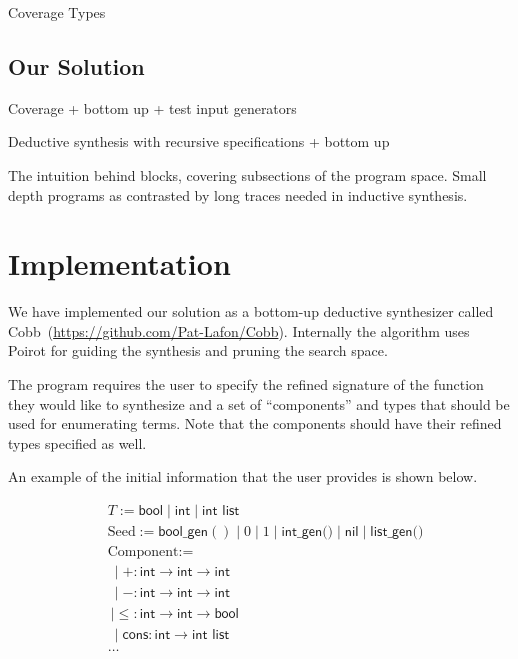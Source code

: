 \documentclass[review, sigplan]{acmart}
\begin{document}
Coverage Types\cite{Poirot}

\subsection{Our Solution}

Coverage + bottom up + test input generators

Deductive synthesis with recursive specifications + bottom up

The intuition behind blocks, covering subsections of the program space. Small
depth programs as contrasted by long traces needed in inductive synthesis.

\section{Implementation}
We have implemented our solution as a bottom-up deductive synthesizer called
Cobb~(\url{https://github.com/Pat-Lafon/Cobb}).
Internally the algorithm uses Poirot for guiding the synthesis and pruning
the search space.

The program requires the user to specify the refined signature of the function
they would like to synthesize and a set of ``components'' and types
that should be used for enumerating terms.
Note that the components should have their refined types specified as
well.

An example of the initial information that the user provides
is shown below.

\begin{align*}
& T := \textsf{bool} \mid \textsf{int} \mid \textsf{int list} \\
& \text{Seed} := \textsf{bool\_gen}() \mid 0 \mid 1 \mid \textsf{int\_gen()} \mid \textsf{nil} \mid \textsf{list\_gen()} \\
& \text{Component} := \\
&\  \mid +: \textsf{int} \rightarrow \textsf{int} \rightarrow \textsf{int}\\
&\  \mid -: \textsf{int} \rightarrow \textsf{int} \rightarrow \textsf{int}\\
&\  \mid \leq: \textsf{int} \rightarrow \textsf{int} \rightarrow \textsf{bool} \\
&\  \mid \textsf{cons}: \textsf{int} \rightarrow \textsf{int list} \\
& \dots
\end{align*}
\end{document}
